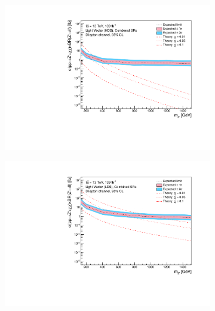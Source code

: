 \documentclass[12pt, a4paper]{book}
\begin{document}
\begin{figure}[!ht]
\begin{subfigure}[b]{0.49\textwidth}
   \end{subfigure}
   \hfill
   \begin{subfigure}[b]{0.49\textwidth}
      \centering
      \includegraphics[width=1\textwidth]{Limits/Model_independent/LV_HDS/mass_exclusion_comb.pdf}
   \end{subfigure}
   \hfill
   \begin{subfigure}[b]{0.49\textwidth}
      \centering
      \includegraphics[width=1\textwidth]{Limits/Model_independent/LV_LDS/mass_exclusion_comb.pdf}
   \end{subfigure}
   \hfill
	\begin{subfigure}[b]{0.49\textwidth}
      \centering

\end{subfigure}
\end{figure}
\end{document}
